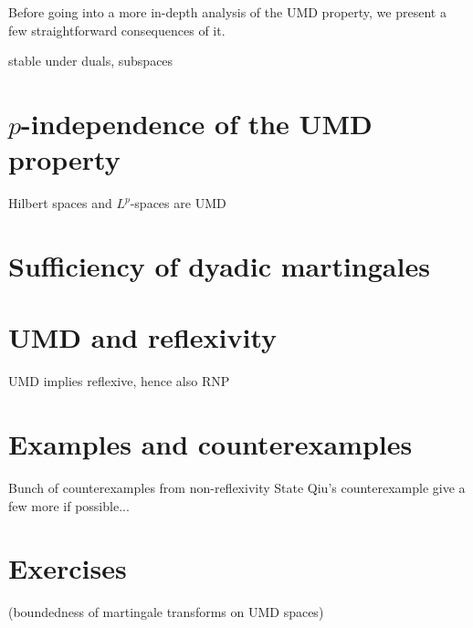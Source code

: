 Before going into a more in-depth analysis of the UMD property, we present a few straightforward consequences of it.


\begin{prop}
  stable under duals, subspaces
\end{prop}



\section{$p$-independence of the UMD property}\label{sec:UMD-p-independence}

\begin{cor}
  Hilbert spaces and $L^p$-spaces are UMD
\end{cor}

\section{Sufficiency of dyadic martingales}

\section{UMD and reflexivity}

UMD implies reflexive, hence also RNP

\section{Examples and counterexamples}

Bunch of counterexamples from non-reflexivity
State Qiu's counterexample
give a few more if possible...

\section*{Exercises}

\begin{exercise}
  (boundedness of martingale transforms on UMD spaces)
\end{exercise}


